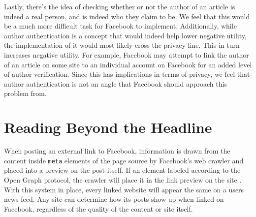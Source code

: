 \documentclass[12pt]{article}
\begin{document}
Lastly, there's the idea of checking whether or not the author of an article is indeed a real person, and is indeed who they claim to be. We feel that this would be a much more difficult task for Facebook to implement. Additionally, while author authentication is a concept that would indeed help lower negative utility, the implementation of it would most likely cross the privacy line. This in turn increases negative utility. For example, Facebook may attempt to link the author of an article on some site to an individual account on Facebook for an added level of author verification. Since this has implications in terms of privacy, we feel that author authentication is not an angle that Facebook should approach this problem from.



\section{Reading Beyond the Headline}
When posting an external link to Facebook, information is drawn from the content inside \texttt{meta} elements of the page source by Facebook's web crawler and placed into a preview on the post itself. If an element labeled according to the Open Graph protocol, the crawler will place it in the link preview on the site \cite{fbwebmaster}. With this system in place, every linked website will appear the same on a users news feed. Any site can determine how its posts show up when linked on Facebook, regardless of the quality of the content or site itself. \\
\end{document}
